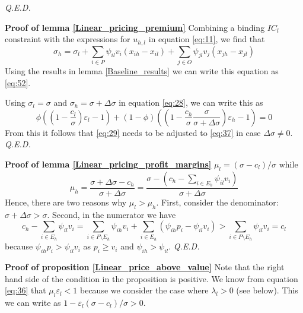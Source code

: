 \documentclass[a4paper,12pt]{article}
\newcommand{\qed}{\hspace*{\fill} {\em Q.E.D.}}
\begin{document}
 \qed

\textbf{Proof of lemma \ref{Linear_pricing_premium}}
Combining a binding \(IC_l\) constraint with the expressions for \(u_{h,l}\) in equation \eqref{eq:11}, we find that
\begin{equation}
\label{eq:53}
\sigma_h = \sigma_l + \sum_{i \in P} \psi_{il}v_i (x_{ih}-x_{il}) + \sum_{j \in O} \psi_{jl} v_j (x_{jh}-x_{jl})
\end{equation}
Using the results in lemma \ref{Baseline_results} we can write this equation as \eqref{eq:52}.

Using \(\sigma_l=\sigma\) and \(\sigma_h=\sigma+\Delta\sigma\) in equation \eqref{eq:28}, we can write this as
\begin{equation}
\label{eq:54}
\phi \left( (1 -\frac{c_l}{\sigma})\varepsilon_l -1 \right) + (1-\phi) \left( (1 - \frac{c_h}{\sigma} \frac{\sigma}{\sigma + \Delta \sigma}) \varepsilon_h -1  \right) = 0
\end{equation}
From this it follows that \eqref{eq:29} needs to be adjusted to \eqref{eq:37} in case \(\Delta \sigma \neq 0\). 
 \qed

\textbf{Proof of lemma \ref{Linear_pricing_profit_margins}}
\(\mu_l = (\sigma-c_l)/\sigma\) while
\begin{equation}
\label{eq:59}
\mu_h = \frac{\sigma+\Delta\sigma - c_h}{\sigma+\Delta\sigma}=\frac{\sigma-(c_h-\sum_{i \in E_h} \psi_{il} v_i)}{\sigma+\Delta\sigma}
\end{equation}
Hence, there are two reasons why \(\mu_l > \mu_h\). First, consider the denominator: \(\sigma+\Delta\sigma>\sigma\). Second, in the numerator we have
\begin{equation}
\label{eq:67}
c_h-\sum_{i \in E_h} \psi_{il} v_i = \sum_{i \in P \setminus E_h} \psi_{ih}v_i + \sum_{i \in E_h} (\psi_{ih}p_i-\psi_{il}v_i) > \sum_{i \in P \setminus E_h} \psi_{il} v_i = c_l
\end{equation}
because \(\psi_{ih}p_i > \psi_{il}v_i\) as \(p_i \geq v_i\) and \(\psi_{ih}>\psi_{il}\). 
 \qed

\textbf{Proof of proposition \ref{Linear_price_above_value}}
Note that the right hand side of the condition in the proposition is positive. We know from equation \eqref{eq:36} that \(\mu_l \varepsilon_l<1\) because we consider the case where \(\lambda_l > 0\) (see below). This we can write as \(1-\varepsilon_l (\sigma-c_l)/\sigma >0\).
\end{document}
